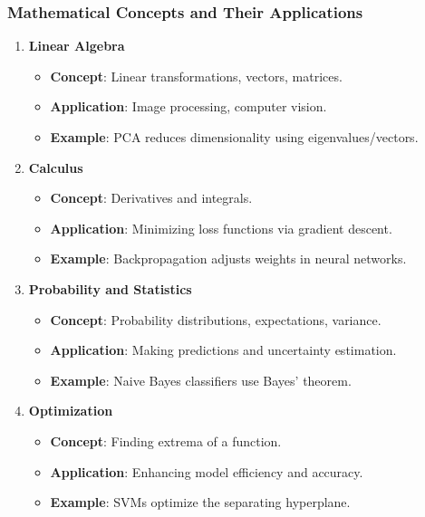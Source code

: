 \documentclass[aspectratio=169]{beamer}
\begin{document}
\begin{frame}[fragile]
    \frametitle{Mathematical Concepts and Their Applications}
    \begin{enumerate}
        \item \textbf{Linear Algebra}
            \begin{itemize}
                \item \textbf{Concept}: Linear transformations, vectors, matrices.
                \item \textbf{Application}: Image processing, computer vision.
                \item \textbf{Example}: PCA reduces dimensionality using eigenvalues/vectors.
            \end{itemize}
        
        \item \textbf{Calculus}
            \begin{itemize}
                \item \textbf{Concept}: Derivatives and integrals.
                \item \textbf{Application}: Minimizing loss functions via gradient descent.
                \item \textbf{Example}: Backpropagation adjusts weights in neural networks.
            \end{itemize}
        
        \item \textbf{Probability and Statistics}
            \begin{itemize}
                \item \textbf{Concept}: Probability distributions, expectations, variance.
                \item \textbf{Application}: Making predictions and uncertainty estimation.
                \item \textbf{Example}: Naive Bayes classifiers use Bayes' theorem.
            \end{itemize}
        
        \item \textbf{Optimization}
            \begin{itemize}
                \item \textbf{Concept}: Finding extrema of a function.
                \item \textbf{Application}: Enhancing model efficiency and accuracy.
                \item \textbf{Example}: SVMs optimize the separating hyperplane.
            \end{itemize}
    \end{enumerate}
\end{frame}
\end{document}
